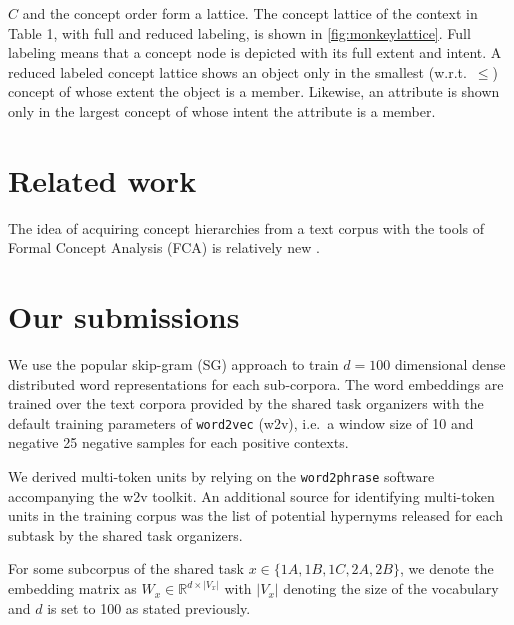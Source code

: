 \documentclass[11pt,a4paper]{article}
\begin{document}
$C$ and the concept order form a %
lattice.  The concept lattice of the context in Table 1, with full and reduced
labeling, is shown in \ref{fig:monkeylattice}.
Full labeling means that a concept node is depicted with its full extent and
intent. A reduced labeled concept lattice shows an object only in the smallest
(w.r.t.~$\le$) concept of whose extent the object is a member.
Likewise, an attribute is shown only in the largest concept of whose intent the
attribute is a member.%

\section{Related work}

The idea of acquiring concept hierarchies from a text corpus with the tools of
Formal Concept Analysis (FCA) is relatively new \citep{Cimiano:2005}.

\section{Our submissions}

We use the popular skip-gram (SG) %
approach \cite{Mikolov:2013f} to train $d=100$ dimensional dense distributed
word representations for each sub-corpora. The word embeddings are trained over the text corpora provided by the shared task organizers with the default training parameters of \texttt{word2vec} (w2v), i.e.~a window size of 10 and negative 25 negative samples for each positive contexts.

We derived multi-token units by relying on the \texttt{word2phrase} software accompanying the w2v toolkit. An additional source for identifying multi-token units in the training corpus was the list of potential hypernyms released for each subtask by the shared task organizers.

For some subcorpus of the shared task $x\in\{1A, 1B, 1C, 2A, 2B\}$, we denote
the embedding matrix as $W_x \in \mathbb{R}^{d \times \lvert V_x \rvert}$ with
$\lvert V_x \rvert$ denoting the size of the vocabulary and $d$ is set to 100
as stated previously.
\end{document}
